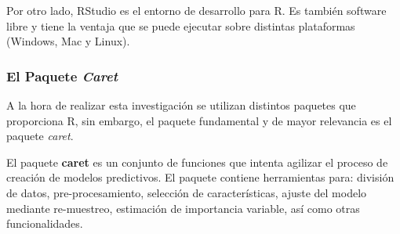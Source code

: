 Por otro lado, RStudio es el entorno de desarrollo para R. Es también software libre y tiene la ventaja que se puede ejecutar sobre distintas plataformas (Windows, Mac y Linux).

\subsubsection{El Paquete \textit{Caret}}
A la hora de realizar esta investigación se utilizan distintos paquetes que proporciona R, sin embargo, el paquete fundamental y de mayor relevancia es el paquete \textit{caret}.

El paquete \textbf{caret} es un conjunto de funciones que intenta agilizar el proceso de creación de modelos predictivos. El paquete contiene herramientas para: división de datos, pre-procesamiento, selección de características, ajuste del modelo mediante re-muestreo, estimación de importancia variable, así como otras funcionalidades. \cite{CARET2019}


